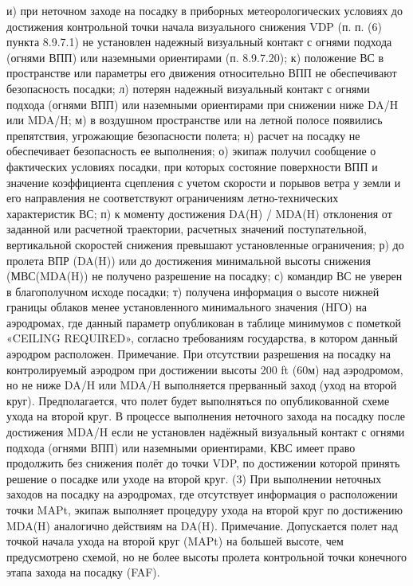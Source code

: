 и)	при неточном заходе на посадку в приборных метеорологических условиях до достижения контрольной точки начала визуального снижения VDP (п. п. (6) пункта 8.9.7.1) не установлен надежный визуальный контакт с огнями подхода (огнями ВПП) или наземными ориентирами (п. 8.9.7.20);
к)	положение ВС в пространстве или параметры его движения относительно ВПП не обеспечивают безопасность посадки;
л)	потерян надежный визуальный контакт с огнями подхода (огнями ВПП) или наземными ориентирами при снижении ниже DA/H или MDA/H;
м)	в воздушном пространстве или на летной полосе появились препятствия, угрожающие безопасности полета;
н)	расчет на посадку не обеспечивает безопасность ее выполнения;
о)	экипаж получил сообщение о фактических условиях посадки, при которых состояние поверхности ВПП и значение коэффициента сцепления с учетом скорости и порывов ветра у земли и его направления не соответствуют ограничениям летно-технических характеристик ВС;
п)	к моменту достижения DA(H) / MDA(H) отклонения от заданной или расчетной траектории, расчетных значений поступательной, вертикальной скоростей снижения превышают установленные ограничения;
р)	до пролета ВПР (DA(H)) или до достижения минимальной высоты снижения (МВС(MDA(H)) не получено разрешение на посадку;
с)	командир ВС не уверен в благополучном исходе посадки;
т)	получена информация о высоте нижней границы облаков менее установленного минимального значения (НГО) на аэродромах, где данный параметр опубликован в таблице минимумов с пометкой «CEILING REQUIRED», согласно требованиям государства, в котором данный аэродром расположен.
Примечание. При отсутствии разрешения на посадку на контролируемый аэродром при достижении высоты 200 ft (60м) над аэродромом, но не ниже DA/H или MDA/H выполняется прерванный заход (уход на второй круг).
Предполагается, что полет будет выполняться по опубликованной схеме ухода на второй круг.
В процессе выполнения неточного захода на посадку после достижения MDA/H если не установлен надёжный визуальный контакт с огнями подхода (огнями ВПП) или наземными ориентирами, КВС имеет право продолжить без снижения полёт до точки VDP, по достижении которой принять решение о посадке или уходе на второй круг.
(3) При выполнении неточных заходов на посадку на аэродромах, где отсутствует информация о расположении точки MAPt, экипаж выполняет процедуру ухода на второй круг по достижению MDA(H) аналогично действиям на DA(H).
Примечание. Допускается полет над точкой начала ухода на второй круг (MAPt) на большей высоте, чем предусмотрено схемой, но не более высоты пролета контрольной точки конечного этапа захода на посадку (FAF).
